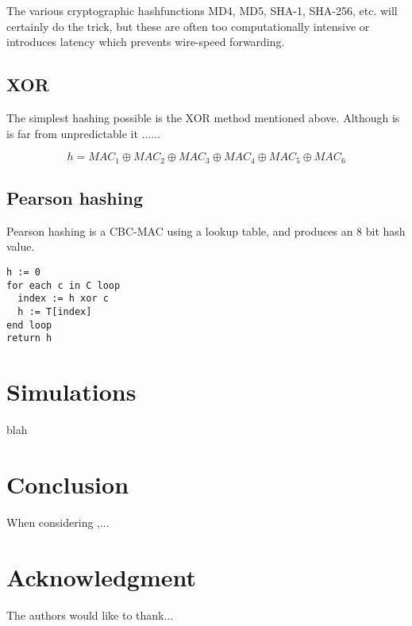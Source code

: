 \documentclass[journal]{IEEEtran}
\begin{document}
The various cryptographic hashfunctions MD4, MD5, SHA-1, SHA-256, etc. will certainly do the trick,
but these are often too computationally intensive or introduces latency which prevents wire-speed
forwarding.

\subsection{XOR}
The simplest hashing possible is the XOR method mentioned above. Although is is 
far from unpredictable it ...... 

$$h = MAC_1 \oplus MAC_2 \oplus MAC_3 \oplus MAC_4 \oplus MAC_5 \oplus MAC_6$$


\subsection{Pearson hashing}
Pearson hashing is a CBC-MAC using a lookup table, and produces an 8 bit hash
value.
\lstset{language=C, numbers=left,numberstyle=\tiny}
\begin{lstlisting}
h := 0
for each c in C loop
  index := h xor c
  h := T[index]
end loop
return h
\end{lstlisting}


\section{Simulations}
blah

\section{Conclusion}
When considering ,...

\section*{Acknowledgment}


The authors would like to thank...

\end{document}
